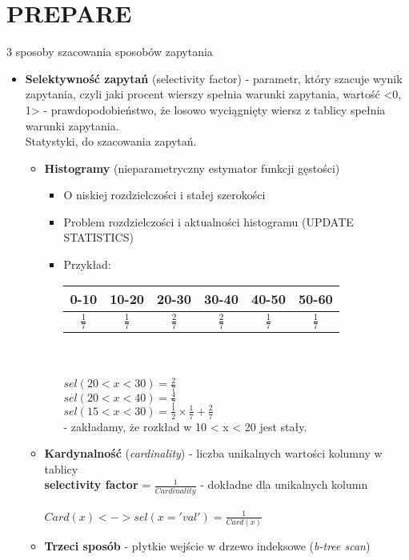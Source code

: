\documentclass[a4paper,twoside]{article}
\begin{document}
  	\section*{PREPARE}
  	3 sposoby szacowania sposobów zapytania
  	\begin{itemize}
  		\item \textbf{Selektywność zapytań} (selectivity factor) - parametr, który szacuje wynik zapytania, czyli jaki procent wierszy spełnia warunki zapytania, wartość <0, 1> - prawdopodobieństwo, że losowo wyciągnięty wiersz z tablicy spełnia warunki zapytania.\\
  		Statystyki, do szacowania zapytań.\
  		\begin{itemize}
  			\item \textbf{Histogramy} (nieparametryczny estymator funkcji gęstości)
  			\begin{itemize}
  				\item O niskiej rozdzielczości i stałej szerokości
  				\item Problem rozdzielczości i aktualności histogramu (UPDATE STATISTICS)
  				\item Przykład:\\
	  				\begin{tabular}{c|c|c|c|c|c}
	  					\hline
	  					0-10 & 10-20 & 20-30 & 30-40 & 40-50 & 50-60\\
	  					\hline
	  					\(\frac{1}{7}\) & \(\frac{1}{7}\) & \(\frac{2}{7}\) & \(\frac{2}{7}\) & \(\frac{1}{7}\) & \(\frac{1}{7}\)\\
	  					\hline
	  				\end{tabular}\\\\
	  				\(sel(20 < x < 30)=\frac{2}{7}\)\\
	  				\(sel(20 < x < 40)=\frac{4}{7}\)\\
	  				\(sel(15 < x < 30)=\frac{1}{2}\times \frac{1}{7}+\frac{2}{7}\)\\ - zakładamy, że rozkład w 10 < x < 20 jest stały.
  			\end{itemize}
  			\item \textbf{Kardynalność} (\textit{cardinality}) - liczba unikalnych wartości kolumny w tablicy\\
  			\textbf{selectivity factor} = \(\frac{1}{Cardinality}\) - dokładne dla unikalnych kolumn\\\\
  			\(Card(x)<->sel(x='val')=\frac{1}{Card(x)}\)
  			\item \textbf{Trzeci sposób} - płytkie wejście w drzewo indeksowe (\textit{b-tree scan})

\end{itemize}
\end{itemize}
\end{document}
